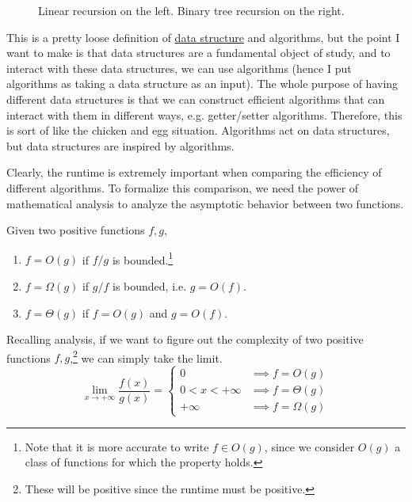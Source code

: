 \begin{figure}[H]
  \caption{Linear recursion on the left. Binary tree recursion on the right. } 
  \label{fig:recursion_fig}
\end{figure}

This is a pretty loose definition of \hyperref[def:data-structure]{data structure} and algorithms, but the point I want to make is that data structures are a fundamental object of study, and to interact with these data structures, we can use algorithms (hence I put algorithms as taking a data structure as an input). The whole purpose of having different data structures is that we can construct efficient algorithms that can interact with them in different ways, e.g. getter/setter algorithms. Therefore, this is sort of like the chicken and egg situation. Algorithms act on data structures, but data structures are inspired by algorithms.  

Clearly, the runtime is extremely important when comparing the efficiency of different algorithms. To formalize this comparison, we need the power of mathematical analysis to analyze the asymptotic behavior between two functions.  

\begin{definition}[Complexity]
  \label{def:complexity}
  Given two positive functions $f, g$, 
  \begin{enumerate}
    \item $f = O(g)$ if $f/g$ is bounded.\footnote{Note that it is more accurate to write $f \in O(g)$, since we consider $O(g)$ a class of functions for which the property holds.} 
    \item $f = \Omega(g)$ if $g/f$ is bounded, i.e. $g = O(f)$. 
    \item $f = \Theta (g)$ if $f = O(g)$ and $g = O(f)$. 
  \end{enumerate}
  Recalling analysis, if we want to figure out the complexity of two positive functions $f, g$,\footnote{These will be positive since the runtime must be positive.} we can simply take the limit. 
  \begin{equation}
    \lim_{x \rightarrow +\infty} \frac{f(x)}{g(x)} = \begin{cases} 
      0 & \implies f = O(g) \\
      0 < x < +\infty & \implies f = \Theta(g) \\
      +\infty & \implies f = \Omega(g)
    \end{cases}
  \end{equation} 
\end{definition}

